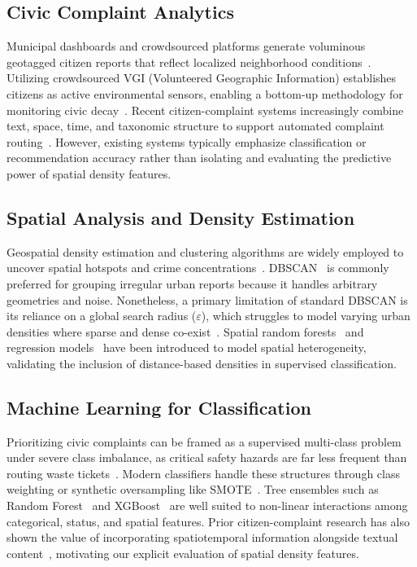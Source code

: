 \documentclass[conference]{IEEEtran}
\begin{document}
\subsection{Civic Complaint Analytics}

Municipal dashboards and crowdsourced platforms generate voluminous geotagged citizen reports that reflect localized neighborhood conditions~\cite{minkoff2016nyc311,kontokosta2017urban}. Utilizing crowdsourced VGI (Volunteered Geographic Information) establishes citizens as active environmental sensors, enabling a bottom-up methodology for monitoring civic decay~\cite{goodchild2007citizens}. Recent citizen-complaint systems increasingly combine text, space, time, and taxonomic structure to support automated complaint routing~\cite{gao2019star}. However, existing systems typically emphasize classification or recommendation accuracy rather than isolating and evaluating the predictive power of spatial density features.

\subsection{Spatial Analysis and Density Estimation}

Geospatial density estimation and clustering algorithms are widely employed to uncover spatial hotspots and crime concentrations~\cite{silverman1986density,chainey2008utility}. DBSCAN~\cite{ester1996dbscan} is commonly preferred for grouping irregular urban reports because it handles arbitrary geometries and noise. Nonetheless, a primary limitation of standard DBSCAN is its reliance on a global search radius ($\varepsilon$), which struggles to model varying urban densities where sparse and dense co-exist~\cite{cesario2023multidensity}. Spatial random forests~\cite{georganos2021geographical} and regression models~\cite{brunsdon1996geographically} have been introduced to model spatial heterogeneity, validating the inclusion of distance-based densities in supervised classification.

\subsection{Machine Learning for Classification}

Prioritizing civic complaints can be framed as a supervised multi-class problem under severe class imbalance, as critical safety hazards are far less frequent than routing waste tickets~\cite{he2009learning}. Modern classifiers handle these structures through class weighting or synthetic oversampling like SMOTE~\cite{chawla2002smote}. Tree ensembles such as Random Forest~\cite{breiman2001random} and XGBoost~\cite{chen2016xgboost} are well suited to non-linear interactions among categorical, status, and spatial features. Prior citizen-complaint research has also shown the value of incorporating spatiotemporal information alongside textual content~\cite{gao2019star}, motivating our explicit evaluation of spatial density features.
\end{document}
